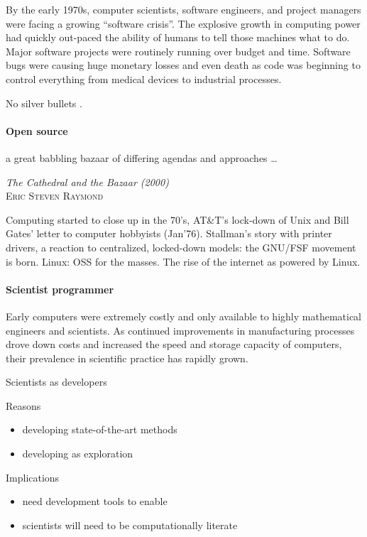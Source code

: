 \documentclass[ChapterTOCs,krantz2]{krantz} %
\begin{document}
By the early 1970s, computer scientists, software engineers, and project
managers were facing a growing ``software crisis''. The explosive growth in
computing power had quickly out-paced the ability of humans to tell those machines
what to do. Major software projects were routinely running over budget and
time. Software bugs were causing huge monetary losses and even death as code
was beginning to control everything from medical devices to industrial processes.

No silver bullets \cite{brooks1995mythical}.

\paragraph{ {\bf Open source}}

\setlength{\epigraphrule}{0pt}
\setlength{\epigraphwidth}{.90\textwidth}
\epigraph%
{%
  a great babbling bazaar of differing agendas and approaches \ldots
}%
{\textit{The Cathedral and the Bazaar (2000)}\\ \textsc{Eric Steven Raymond} }

Computing started to close up in the 70's, AT\&T's lock-down of Unix
and Bill Gates' letter to computer hobbyists (Jan'76). Stallman's
story with printer drivers, a reaction to centralized, locked-down
models: the GNU/FSF movement is born. Linux: OSS for the masses. The
rise of the internet as powered by Linux.


\paragraph{ {\bf Scientist programmer}}

Early computers were extremely costly and only available to highly mathematical
engineers and scientists. As continued improvements in manufacturing processes
drove down costs and increased the speed and storage capacity of computers, their
prevalence in scientific practice has rapidly grown.

Scientists as developers

Reasons

\begin{itemize}
\item  developing state-of-the-art methods
\item developing as exploration
\end{itemize}

Implications

\begin{itemize}
\item need development tools to enable
\item scientists will need to be computationally literate
\end{itemize}
\end{document}
